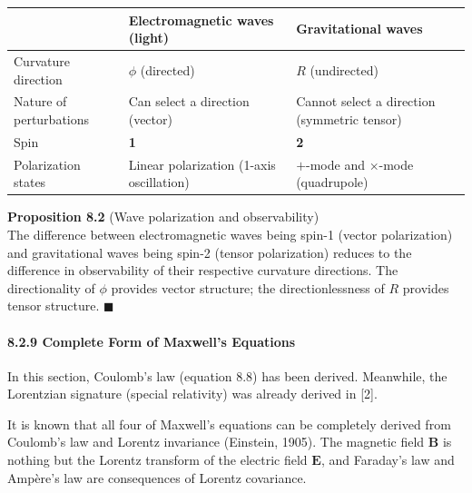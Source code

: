 \documentclass[a4paper,11pt]{article}
\theoremstyle{definition}
\begin{document}
{\def\LTcaptype{none} %
\begin{longtable}[]{@{}
  >{\raggedright\arraybackslash}p{}
  >{\raggedright\arraybackslash}p{}
  >{\raggedright\arraybackslash}p{}@{}}
\toprule\noalign{}
\begin{minipage}[b]{\linewidth}\raggedright
\end{minipage} & \begin{minipage}[b]{\linewidth}\raggedright
Electromagnetic waves (light)
\end{minipage} & \begin{minipage}[b]{\linewidth}\raggedright
Gravitational waves
\end{minipage} \\
\midrule\noalign{}
\endhead
\bottomrule\noalign{}
\endlastfoot
Curvature direction & \(\phi\) (directed) & \(R\) (undirected) \\
Nature of perturbations & Can select a direction (vector) & Cannot select a direction (symmetric tensor) \\
Spin & \textbf{1} & \textbf{2} \\
Polarization states & Linear polarization (1-axis oscillation) & \(+\)-mode and \(\times\)-mode (quadrupole) \\
\end{longtable}
}

\textbf{Proposition 8.2} (Wave polarization and observability)\\
The difference between electromagnetic waves being spin-1 (vector polarization) and gravitational waves being spin-2 (tensor polarization) reduces to the difference in observability of their respective curvature directions. The directionality of \(\phi\) provides vector structure; the directionlessness of \(R\) provides tensor structure. \(\blacksquare\)

\paragraph{8.2.9 Complete Form of Maxwell's Equations}\label{complete-form-of-maxwells-equations}

In this section, Coulomb's law (equation 8.8) has been derived. Meanwhile, the Lorentzian signature (special relativity) was already derived in {[}2{]}.

It is known that all four of Maxwell's equations can be completely derived from Coulomb's law and Lorentz invariance (Einstein, 1905). The magnetic field \(\mathbf{B}\) is nothing but the Lorentz transform of the electric field \(\mathbf{E}\), and Faraday's law and Ampère's law are consequences of Lorentz covariance.
\end{document}
